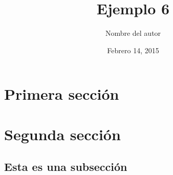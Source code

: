 \documentclass[a4paper,12pt, spanish, twocolumn]{article}
\begin{document}
	\title{Ejemplo 6}
	\author{Nombre del autor}
	\date{Febrero 14, 2015}
	\maketitle
	\begin{abstract}
	\blindtext
	\end{abstract}
	\section{Primera sección}
	\blindtext
	\begin{quote}
		\blindtext
	\end{quote}

	\section{Segunda sección}
		\blindtext[1]
		\subsection{Esta es una subsección}
			\blindtext[5]
\end{document}
